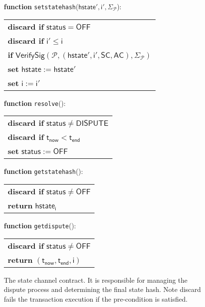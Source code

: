 \documentclass{llncs}
\newcommand{\chanstatus}{\mathsf{status}}
\newcommand{\chandispute}{\mathsf{DISPUTE}}
\newcommand{\chanoff}{\mathsf{OFF}}
\newcommand{\hstate}{\mathsf{hstate}}
\newcommand{\hstatei}{\mathsf{hstate}_{\monotoniccounter}}
\newcommand{\monotoniccounter}{\mathsf{i}}
\newcommand{\participant}{\mathcal{P}}
\newcommand{\statechannel}{\mathsf{SC}}
\newcommand{\verifysig}{\mathsf{VerifySig}}
\newcommand{\appcontract}{\mathsf{AC}}
\newcommand{\timenow}{\mathsf{t}_{\mathsf{now}}}
\newcommand{\timeend}{\mathsf{t}_{\mathsf{end}}}
\newcommand{\oninput}{\textcolor{entry}{\bf function }}
\newcommand{\stringlitt}[1]{\texttt{\textcolor{string}{#1}}}
\begin{document}
\begin{figure}[h]
\begin{boxedminipage}{\columnwidth}
		
		\begin{flushleft}
			\oninput  \stringlitt{setstatehash}($\hstate', \monotoniccounter', \Sigma_{\participant}$):
		\end{flushleft}
		\begin{tabular}{l}
			\quad \textbf{discard if} $\chanstatus = \chanoff$ \\
			\quad \textbf{discard if} $\monotoniccounter' \leq \monotoniccounter$ \\
			\quad \textbf{if} $\verifysig(\participant, (\hstate', \monotoniccounter', \statechannel, \appcontract), \Sigma_{\participant})$ \\
			\quad \quad \textbf{set} $\hstate := \hstate'$ \\
			\quad \quad \textbf{set} $\monotoniccounter := \monotoniccounter'$ \\
		\end{tabular}
		
		\begin{flushleft} 
			\oninput \stringlitt{resolve}(): 
		\end{flushleft}
		\begin{tabular}{l}
		\quad \textbf{discard if} $\chanstatus \neq \chandispute$ \\
		\quad \textbf{discard if} $\timenow < \timeend$ \\
		\quad \textbf{set} $\chanstatus := \chanoff$ 
		\end{tabular}
	
		\begin{flushleft} 
		\oninput \stringlitt{getstatehash}(): 
		\end{flushleft}
		\begin{tabular}{l}
		\quad \textbf{discard if} $\chanstatus \neq \chanoff$ \\
		\quad \textbf{return} $\hstatei$
		\end{tabular}
		
		\begin{flushleft} 
			\oninput \stringlitt{getdispute}(): 
		\end{flushleft}
		\begin{tabular}{l}
			\quad \textbf{discard if} $\chanstatus \neq \chanoff$ \\
			\quad \textbf{return} $(\timenow, \timeend, \monotoniccounter)$
		\end{tabular}
	\end{boxedminipage}
	\caption{The state channel contract. It is responsible for managing the dispute process and determining the final state hash. Note discard fails the transaction execution if the pre-condition is satisfied.}
\end{figure}
\end{document}
